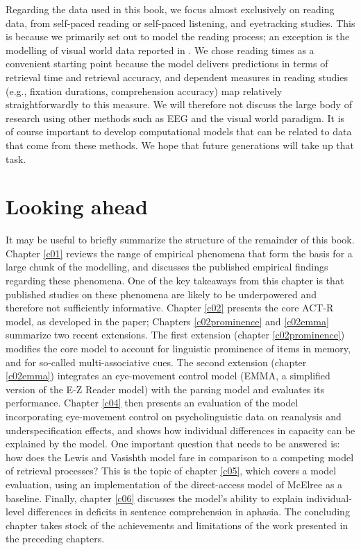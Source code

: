 \documentclass{cambridge7A}\usepackage[]{graphicx}\usepackage[]{color}
\begin{document}
Regarding the data used in this book, we focus almost exclusively on reading data, from  self-paced reading or  self-paced listening, and  eyetracking studies. This is because we primarily set out to model the reading process;  an exception is the modelling of visual world data reported in  \cite{PatilEtAl2016}. We chose reading times as a convenient starting point because the \cite{LewisVasishth2005} model delivers predictions in terms of retrieval time and retrieval accuracy, and dependent measures in reading studies (e.g., fixation durations, comprehension accuracy) map relatively straightforwardly to this measure.  We will therefore not discuss the large body of research using other methods such as EEG and the visual world paradigm.  It is of course important to develop computational models that can be related to data that come from these methods. We hope that future generations will take up that task.

\section{Looking ahead}

It may be useful to briefly summarize the structure of the remainder of this book. Chapter \ref{c01} reviews the range of empirical phenomena that form the basis for a large chunk of the modelling, and discusses the published empirical findings regarding these phenomena.  One of the key takeaways from this chapter is that published studies on these phenomena are likely to be  underpowered and therefore not sufficiently informative. Chapter \ref{c02} presents the core  ACT-R model, as developed in the \cite{LewisVasishth2005} paper; Chapters \ref{c02prominence} and \ref{c02emma} summarize two recent extensions. The first extension (chapter \ref{c02prominence}) modifies the core model to account for linguistic  prominence of items in memory, and for so-called  multi-associative cues. The second extension (chapter \ref{c02emma}) integrates an eye-movement control model  (EMMA, a simplified version of the  E-Z Reader model) with the parsing model and evaluates its performance. Chapter \ref{c04} then presents an evaluation of the model incorporating eye-movement control on psycholinguistic data on  reanalysis and  underspecification effects, and shows how  individual differences in capacity can be explained by the model.  One important question that needs to be answered is: how does the Lewis and Vasishth model fare in comparison to a competing model of retrieval processes? This is the topic of chapter \ref{c05}, which covers a model evaluation, using an implementation of the  direct-access model of McElree as a baseline.  Finally, chapter \ref{c06} discusses the model's ability to explain  individual-level differences in deficits in sentence comprehension in aphasia. The concluding chapter takes stock of the achievements and limitations of the work  presented in the preceding chapters. 
\end{document}
